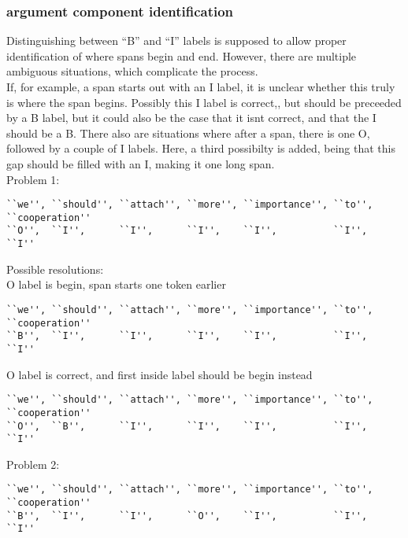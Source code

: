\documentclass[12]{article}
\theoremstyle{mytheoremstyle}
\theoremstyle{mytheoremstyle}
\theoremstyle{myproblemstyle}
\begin{document}
  \subsubsection{argument component identification}
  Distinguishing between ``B'' and ``I'' labels is supposed to allow proper identification of where spans begin and end. However, there are multiple ambiguous situations, which complicate the process. \\
  If, for example, a span starts out with an I label, it is unclear whether this truly is where the span begins. Possibly this I label is correct,, but should be preceeded by a B label, but it could also be the case that it isnt correct, and that the I should be a B. There also are situations where after a span, there is one O, followed by a couple of I labels. Here, a third possibilty is added, being that this gap should be filled with an I, making it one long span.
  \vspace{2ex} \\
  Problem 1:
  \vspace{-1.5ex}
  \begin{verbatim}
``we'', ``should'', ``attach'', ``more'', ``importance'', ``to'', ``cooperation''
``O'',  ``I'',      ``I'',      ``I'',    ``I'',          ``I'',  ``I''
  \end{verbatim}
  \vspace{-4ex}
  Possible resolutions:\\
  O label is begin, span starts one token earlier
  \vspace{-1.5ex}
  \begin{verbatim}
``we'', ``should'', ``attach'', ``more'', ``importance'', ``to'', ``cooperation''
``B'',  ``I'',      ``I'',      ``I'',    ``I'',          ``I'',  ``I''
  \end{verbatim}
  \vspace{-4ex}
  O label is correct, and first inside label should be begin instead
  \vspace{-1.5ex}
  \begin{verbatim}
``we'', ``should'', ``attach'', ``more'', ``importance'', ``to'', ``cooperation''
``O'',  ``B'',      ``I'',      ``I'',    ``I'',          ``I'',  ``I''
  \end{verbatim}
  \vspace{-2ex}
  Problem 2:
  \vspace{-1.5ex}
  \begin{verbatim}
``we'', ``should'', ``attach'', ``more'', ``importance'', ``to'', ``cooperation''
``B'',  ``I'',      ``I'',      ``O'',    ``I'',          ``I'',  ``I''
  \end{verbatim}
\end{document}
